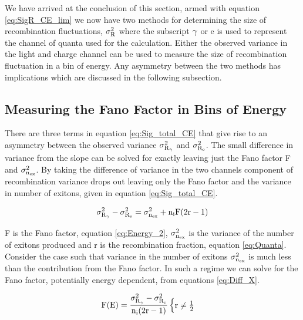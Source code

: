 We have arrived at the conclusion of this section, armed with equation \ref{eq:SigR_CE_lim} we now have two methods for determining the size of recombination fluctuations, $\rm\sigma_{R}^2$ where the subscript $\rm \gamma$ or e is used to represent the channel of quanta used for the calculation. Either the observed variance in the light and charge channel can be used to measure the size of recombination fluctuation in a bin of energy. Any asymmetry between the two methods has implications which are discussed in the following subsection.


\subsection{Measuring the Fano Factor in Bins of Energy}

There are three terms in equation \ref{eq:Sig_total_CE} that give rise to an asymmetry between the observed variance $\rm \sigma_{R_\gamma}^2$  and  $\rm \sigma_{R_e}^2$. The small difference in variance from the slope can be solved for exactly leaving just the Fano factor F and $\rm \sigma_{n_{ex}}^2$. By taking the difference of variance in the two channels component of recombination variance drops out leaving only the Fano factor and the variance in number of exitons, given in equation \ref{eq:Sig_total_CE}.

\begin{equation}
\rm \sigma_{R_\gamma}^2 - \sigma_{R_e}^2 = \sigma_{n_{ex}}^2 + n_iF(2r-1) 
\label{eq:Diff_X}
\end{equation}

F is the Fano factor, equation \ref{eq:Energy_2}, $\rm \sigma_{n_{ex}}^2$ is the variance of the number of exitons produced and r is the recombination fraction, equation \ref{eq:Quanta}. %
Consider the case such that variance in the number of exitons $\rm \sigma_{n_{ex}}^2$ is much less than the contribution from the Fano factor. In such a regime we can solve for the Fano factor, potentially energy dependent, from equations \ref{eq:Diff_X}.

\begin{equation}
\rm F(E)=\frac{\sigma_{R_\gamma}^2 - \sigma_{R_e}^2}{n_i(2r-1)}
\begin{cases} \rm r \neq \frac{1}{2}\\
\end{cases}
\label{eq:Fano}
\end{equation}

